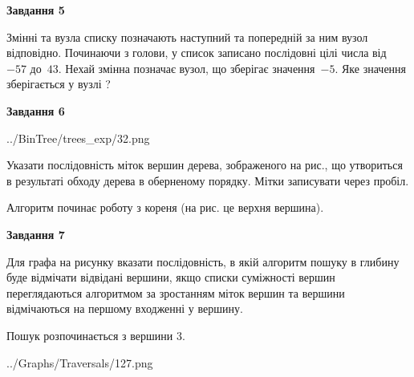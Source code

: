 \documentclass[12pt, ukrainian]{article}
\begin{document}
{\begin {large}
{\begin {center}\textbf{Завдання 5}\end {center}}\par
Змінні  та  вузла списку позначають наступний та попередній за ним вузол відповідно. Починаючи з голови, у список записано послідовні цілі числа від~$-57$ до~$43$. Нехай змінна  позначає вузол, що зберігає значення~$-5$.
Яке значення зберігається у вузлі  ?\par
\newpage

{\begin {center}\textbf{Завдання 6}\end {center}}\par

\begin{center}
	{../BinTree/trees_exp/32.png}
\end{center}
Указати послідовність міток вершин дерева, зображеного на рис., що утвориться в результаті обходу дерева в оберненому порядку. Мітки записувати через пробіл.\par Алгоритм починає роботу з кореня (на рис. це верхня вершина).\par
\newpage

{\begin {center}\textbf{Завдання 7}\end {center}}\par
Для графа на рисунку вказати послідовність, в якій алгоритм пошуку в глибину буде відмічати відвідані вершини, якщо списки суміжності вершин переглядаються алгоритмом за зростанням міток вершин та вершини відмічаються на першому вход\-женні у вершину.\par
Пошук розпочинається з вершини 3.\par

\begin{center}
	{../Graphs/Traversals/127.png}
\end{center}\par
\newpage


\end{large}}
\end{document}
